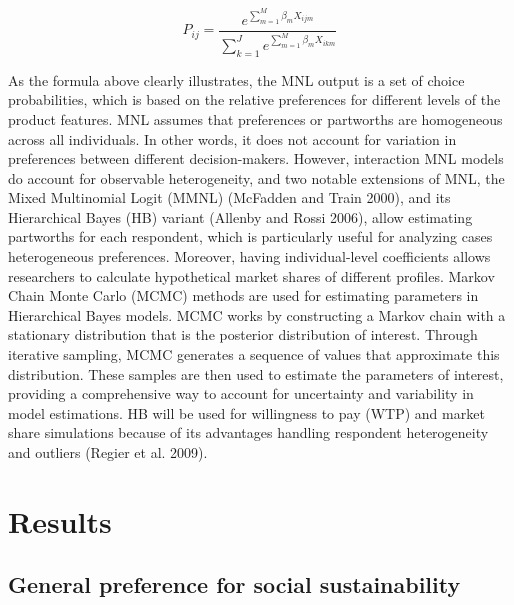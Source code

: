 \documentclass[
  12pt,
]{article}
\begin{document}
\[
P_{ij} = \frac{e^{\sum_{m=1}^M \beta_{m} X_{ijm}}}{\sum_{k=1}^J e^{\sum_{m=1}^M \beta_{m} X_{ikm}}}
\]

As the formula above clearly illustrates, the MNL output is a set of choice probabilities, which is based on the relative preferences for different levels of the product features. MNL assumes that preferences or partworths are homogeneous across all individuals. In other words, it does not account for variation in preferences between different decision-makers. However, interaction MNL models do account for observable heterogeneity, and two notable extensions of MNL, the Mixed Multinomial Logit (MMNL) (McFadden and Train 2000), and its Hierarchical Bayes (HB) variant (Allenby and Rossi 2006), allow estimating partworths for each respondent, which is particularly useful for analyzing cases heterogeneous preferences. Moreover, having individual-level coefficients allows researchers to calculate hypothetical market shares of different profiles. Markov Chain Monte Carlo (MCMC) methods are used for estimating parameters in Hierarchical Bayes models. MCMC works by constructing a Markov chain with a stationary distribution that is the posterior distribution of interest. Through iterative sampling, MCMC generates a sequence of values that approximate this distribution. These samples are then used to estimate the parameters of interest, providing a comprehensive way to account for uncertainty and variability in model estimations. HB will be used for willingness to pay (WTP) and market share simulations because of its advantages handling respondent heterogeneity and outliers (Regier et al. 2009).

\hypertarget{results}{%
\section{Results}\label{results}}

\hypertarget{general-preference-for-social-sustainability}{%
\subsection{General preference for social sustainability}\label{general-preference-for-social-sustainability}}
\end{document}
